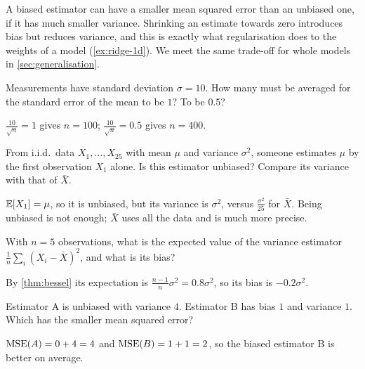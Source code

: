 \begin{mlnote}
A biased estimator can have a smaller mean squared error than an unbiased one, if
it has much smaller variance. Shrinking an estimate towards zero introduces
bias but reduces variance, and this is exactly what regularisation does to the
weights of a model (\cref{ex:ridge-1d}). We meet the same trade-off for whole
models in \cref{sec:generalisation}.
\end{mlnote}

\sectionexercises

\begin{exercise}
Measurements have standard deviation $\sigma = 10$. How many must be averaged for
the standard error of the mean to be $1$? To be $0.5$?
\end{exercise}
\begin{solution}
$\tfrac{10}{\sqrt n} = 1$ gives $n = 100$; $\tfrac{10}{\sqrt n} = 0.5$ gives
$n = 400$.
\end{solution}

\begin{exercise}
From i.i.d.\ data $X_1, \dots, X_{25}$ with mean $\mu$ and variance $\sigma^2$,
someone estimates $\mu$ by the first observation $X_1$ alone. Is this estimator
unbiased? Compare its variance with that of $\bar X$.
\end{exercise}
\begin{solution}
$\mathbb{E}[X_1] = \mu$, so it is unbiased, but its variance is $\sigma^2$, versus
$\tfrac{\sigma^2}{25}$ for $\bar X$. Being unbiased is not enough; $\bar X$ uses
all the data and is much more precise.
\end{solution}

\begin{exercise}
With $n = 5$ observations, what is the expected value of the variance estimator
$\frac1n\sum_i(X_i - \bar X)^2$, and what is its bias?
\end{exercise}
\begin{solution}
By \cref{thm:bessel} its expectation is $\tfrac{n-1}{n}\sigma^2 = 0.8\sigma^2$, so
its bias is $-0.2\sigma^2$.
\end{solution}

\begin{exercise}
Estimator A is unbiased with variance $4$. Estimator B has bias $1$ and variance
$1$. Which has the smaller mean squared error?
\end{exercise}
\begin{solution}
$\operatorname{MSE}(A) = 0 + 4 = 4$ and $\operatorname{MSE}(B) = 1 + 1 = 2$, so the biased estimator B is
better on average.
\end{solution}

